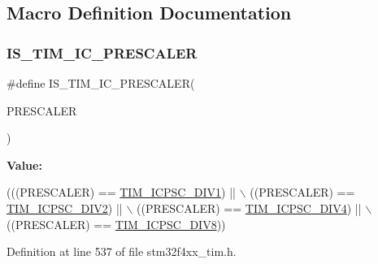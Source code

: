 \subsection{Macro Definition Documentation}
\mbox{\label{group___t_i_m___input___capture___prescaler_ga91d219d7a210eb0a4bb49d72bda6b321}} 
\subsubsection{\texorpdfstring{I\+S\+\_\+\+T\+I\+M\+\_\+\+I\+C\+\_\+\+P\+R\+E\+S\+C\+A\+L\+ER}{IS\_TIM\_IC\_PRESCALER}}
{\footnotesize\ttfamily \#define I\+S\+\_\+\+T\+I\+M\+\_\+\+I\+C\+\_\+\+P\+R\+E\+S\+C\+A\+L\+ER(\begin{DoxyParamCaption}\item[{}]{P\+R\+E\+S\+C\+A\+L\+ER }\end{DoxyParamCaption})}

{\bfseries Value\+:}
\begin{DoxyCode}
(((PRESCALER) == \hyperlink{group___t_i_m___input___capture___prescaler_ga8acb44abe3147d883685c1f9f1ce410e}{TIM\_ICPSC\_DIV1}) || \(\backslash\)
                                        ((PRESCALER) == \hyperlink{group___t_i_m___input___capture___prescaler_ga1d8a7b66add914e2ddd910d2d700978f}{TIM\_ICPSC\_DIV2}) || \(\backslash\)
                                        ((PRESCALER) == \hyperlink{group___t_i_m___input___capture___prescaler_gaf5a675046430fa0f0c95b0dac612828f}{TIM\_ICPSC\_DIV4}) || \(\backslash\)
                                        ((PRESCALER) == \hyperlink{group___t_i_m___input___capture___prescaler_ga5086cb03c89a5c67b199d20b605f00cb}{TIM\_ICPSC\_DIV8}))
\end{DoxyCode}


Definition at line 537 of file stm32f4xx\+\_\+tim.\+h.

\mbox{\label{group___t_i_m___input___capture___prescaler_ga8acb44abe3147d883685c1f9f1ce410e}} 
